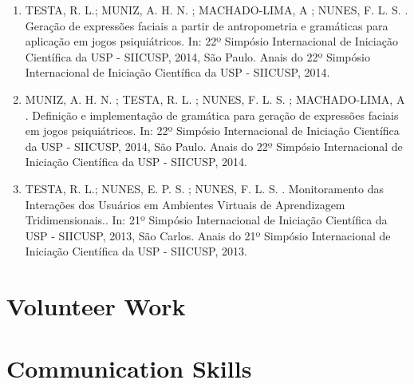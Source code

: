 \documentclass[11pt,a4paper,sans]{moderncv} %
\begin{document}
\begin{enumerate}
    \item  TESTA, R. L.; MUNIZ, A. H. N. ; MACHADO-LIMA, A ; NUNES, F. L. S. . Geração de expressões faciais a partir de antropometria e gramáticas para aplicação em jogos psiquiátricos. In: 22º Simpósio Internacional de Iniciação Científica da USP - SIICUSP, 2014, São Paulo. Anais do 22º Simpósio Internacional de Iniciação Científica da USP - SIICUSP, 2014.
    \item  MUNIZ, A. H. N. ; TESTA, R. L. ; NUNES, F. L. S. ; MACHADO-LIMA, A . Definição e implementação de gramática para geração de expressões faciais em jogos psiquiátricos. In: 22º Simpósio Internacional de Iniciação Científica da USP - SIICUSP, 2014, São Paulo. Anais do 22º Simpósio Internacional de Iniciação Científica da USP - SIICUSP, 2014.
    \item  TESTA, R. L.; NUNES, E. P. S. ; NUNES, F. L. S. . Monitoramento das Interações dos Usuários em Ambientes Virtuais de Aprendizagem Tridimensionais.. In: 21º Simpósio Internacional de Iniciação Científica da USP - SIICUSP, 2013, São Carlos. Anais do 21º Simpósio Internacional de Iniciação Científica da USP - SIICUSP, 2013.
\end{enumerate}
\section{Volunteer Work}



\section{Communication Skills}

\end{document}

